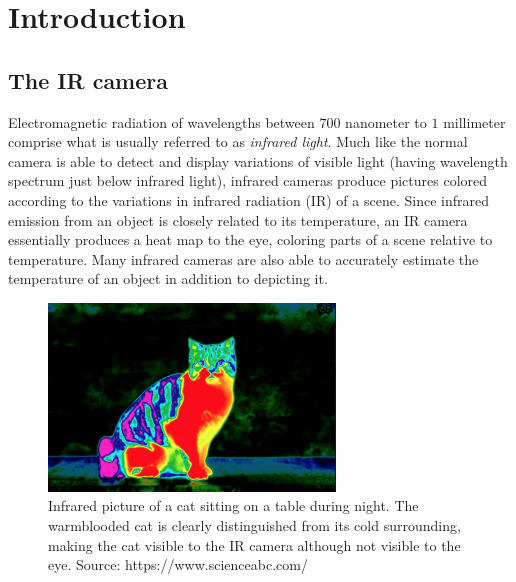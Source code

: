 \section{Introduction}


\subsection{The IR camera}
Electromagnetic radiation of wavelengths between $700$ nanometer to $1$ millimeter comprise what is usually referred to as \textit{infrared light}. Much like the normal camera is able to detect and display variations of visible light (having wavelength spectrum just below infrared light), infrared cameras produce pictures colored according to the variations in infrared radiation  (IR) of a scene. Since infrared emission from an object is closely related to its temperature, an IR camera essentially produces a heat map to the eye, coloring parts of a scene relative to temperature. Many infrared cameras are also able to accurately estimate the temperature of an object in addition to depicting it.

\begin{figure}[h]
\begin{center}
\includegraphics[height=5cm]{gfx/cat.png}
\caption{Infrared picture of a cat sitting on a table during night. The warmblooded cat is clearly distinguished from its cold surrounding, making the cat visible to the IR camera although not visible to the eye. Source: https://www.scienceabc.com/}
\end{center}
\end{figure}

